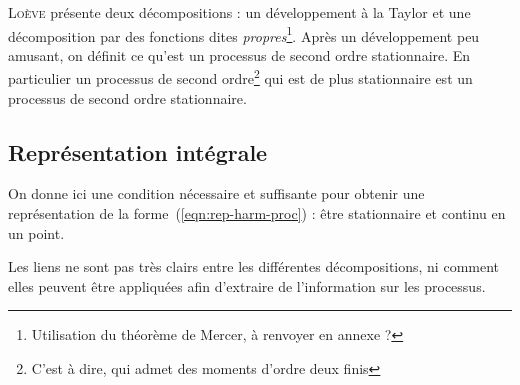 \textsc{Loève} présente deux décompositions : un développement à la
Taylor et une décomposition par des fonctions dites
\emph{propres}\footnote{Utilisation du théorème de Mercer, à renvoyer
  en annexe ?}. Après un développement peu amusant, on définit ce
qu'est un processus de second ordre stationnaire. En particulier un
processus de second ordre\footnote{C'est à dire, qui admet des moments
  d'ordre deux finis} qui est de plus stationnaire est un processus de
second ordre stationnaire.

\subsection{Représentation intégrale}
On donne ici une condition nécessaire et suffisante pour obtenir une
représentation de la forme~(\ref{eqn:rep-harm-proc}) : être
stationnaire et continu en un point.

\begin{alert}
  Les liens ne sont pas très clairs entre les différentes
  décompositions, ni comment elles peuvent être appliquées afin
  d'extraire de l'information sur les processus.
\end{alert}